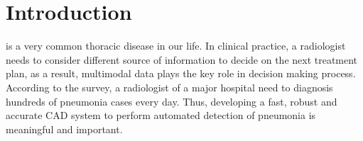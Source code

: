 \documentclass[journal]{IEEEtran}
\begin{document}
%
\IEEEpeerreviewmaketitle


\section{Introduction}
\label{intro}
% 
% 
% 
% 
 is a very common thoracic disease in our life. In clinical practice, a radiologist needs to consider different source of information to decide on the next treatment plan, as a result, multimodal data plays the key role in decision making process. According to the survey, a radiologist of a major hospital need to diagnosis hundreds of pneumonia cases every day. Thus, developing a fast, robust and accurate CAD system to perform automated detection of pneumonia is meaningful and important. 
\end{document}
